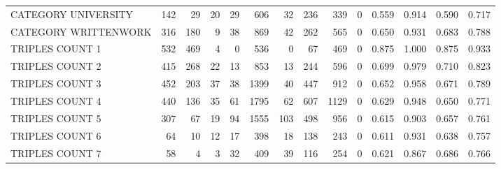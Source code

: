 \begin{tabular}{lrrrrrrrrrllll}
 CATEGORY UNIVERSITY      &             142 &            29 &              20 &              29 &             606 &   32 &  236 &  339 &    0 & 0.559 & 0.914 & 0.590 & 0.717 \\
 CATEGORY WRITTENWORK     &             316 &           180 &               9 &              38 &             869 &   42 &  262 &  565 &    0 & 0.650 & 0.931 & 0.683 & 0.788 \\
 TRIPLES COUNT 1          &             532 &           469 &               4 &               0 &             536 &    0 &   67 &  469 &    0 & 0.875 & 1.000 & 0.875 & 0.933 \\
 TRIPLES COUNT 2          &             415 &           268 &              22 &              13 &             853 &   13 &  244 &  596 &    0 & 0.699 & 0.979 & 0.710 & 0.823 \\
 TRIPLES COUNT 3          &             452 &           203 &              37 &              38 &            1399 &   40 &  447 &  912 &    0 & 0.652 & 0.958 & 0.671 & 0.789 \\
 TRIPLES COUNT 4          &             440 &           136 &              35 &              61 &            1795 &   62 &  607 & 1129 &    0 & 0.629 & 0.948 & 0.650 & 0.771 \\
 TRIPLES COUNT 5          &             307 &            67 &              19 &              94 &            1555 &  103 &  498 &  956 &    0 & 0.615 & 0.903 & 0.657 & 0.761 \\
 TRIPLES COUNT 6          &              64 &            10 &              12 &              17 &             398 &   18 &  138 &  243 &    0 & 0.611 & 0.931 & 0.638 & 0.757 \\
 TRIPLES COUNT 7          &              58 &             4 &               3 &              32 &             409 &   39 &  116 &  254 &    0 & 0.621 & 0.867 & 0.686 & 0.766 \\
\hline
\end{tabular}